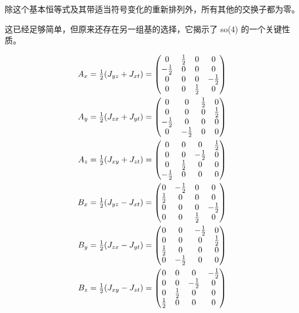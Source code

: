 除这个基本恒等式及其带适当符号变化的重新排列外，所有其他的交换子都为零。

这已经足够简单，但原来还存在另一组基的选择，它揭示了 so(4) 的一个关键性质。

\begin{align}
A_x = \tfrac12(J_{yz}+J_{xt}) &= \begin{pmatrix} 0 & \tfrac{1}{2} & 0 & 0 \\ -\tfrac{1}{2} & 0 & 0 & 0 \\ 0 & 0 & 0 & -\tfrac{1}{2} \\ 0 & 0 & \tfrac{1}{2} & 0 \end{pmatrix} \\
A_y = \tfrac12(J_{zx}+J_{yt}) &= \begin{pmatrix} 0 & 0 & \tfrac{1}{2} & 0 \\ 0 & 0 & 0 & \tfrac{1}{2} \\ -\tfrac{1}{2} & 0 & 0 & 0 \\ 0 & -\tfrac{1}{2} & 0 & 0 \end{pmatrix} \\
A_z = \tfrac12(J_{xy}+J_{zt}) &= \begin{pmatrix} 0 & 0 & 0 & \tfrac{1}{2} \\ 0 & 0 & -\tfrac{1}{2} & 0 \\ 0 & \tfrac{1}{2} & 0 & 0 \\ -\tfrac{1}{2} & 0 & 0 & 0 \end{pmatrix} \\
B_x = \tfrac12(J_{yz}-J_{xt}) &= \begin{pmatrix} 0 & -\tfrac{1}{2} & 0 & 0 \\ \tfrac{1}{2} & 0 & 0 & 0 \\ 0 & 0 & 0 & -\tfrac{1}{2} \\ 0 & 0 & \tfrac{1}{2} & 0 \end{pmatrix} \\
B_y = \tfrac12(J_{zx}-J_{yt}) &= \begin{pmatrix} 0 & 0 & -\tfrac{1}{2} & 0 \\ 0 & 0 & 0 & \tfrac{1}{2} \\ \tfrac{1}{2} & 0 & 0 & 0 \\ 0 & -\tfrac{1}{2} & 0 & 0 \end{pmatrix} \\
B_z = \tfrac12(J_{xy}-J_{zt}) &= \begin{pmatrix} 0 & 0 & 0 & -\tfrac{1}{2} \\ 0 & 0 & -\tfrac{1}{2} & 0 \\ 0 & \tfrac{1}{2} & 0 & 0 \\ \tfrac{1}{2} & 0 & 0 & 0 \end{pmatrix}
\end{align}


